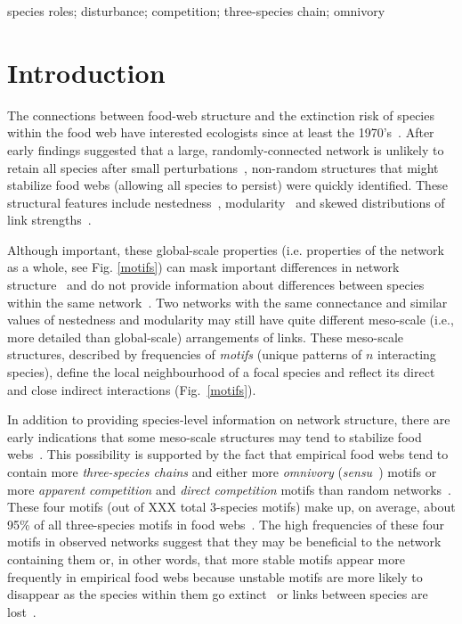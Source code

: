 \documentclass[12pt]{article}
\begin{document}
\begin{spacing}{2.0}
	species roles; disturbance; competition; three-species chain; omnivory

\clearpage
    
\section*{Introduction}

	The connections between food-web structure and the extinction risk of species within the food web have interested ecologists since at least the 1970's~\citep{May1972}. After early findings suggested that a large, randomly-connected network is unlikely to retain all species after small perturbations~\citep{Gardner1970,May1972}, non-random structures that might stabilize food webs (allowing all species to persist) were quickly identified. These structural features include nestedness~\citep{Allesina2012,Sauve2014}, modularity~\citep{Sauve2014,Thebault2010} and skewed distributions of link strengths~\citep{McCann1998,Gross2009,Rooney2012,Wootton2016}.
	
	
	Although important, these global-scale properties (i.e. properties of the network as a whole, see Fig. \ref{motifs}) can mask important differences in  network structure~\citep{Simmons2019} and do not provide information about differences between species within the same network~\citep{Cirtwill2018FoodWebs}. 
	Two networks with the same connectance and similar values of nestedness and modularity may still have quite different meso-scale (i.e., more detailed than global-scale) arrangements of links. 
	These meso-scale structures, described by frequencies of \emph{motifs} (unique patterns of $n$ interacting species), define the local neighbourhood of a focal species and reflect its direct and close indirect interactions (Fig.~\ref{motifs}).
	
	
    In addition to providing species-level information on network structure, there are early indications that some meso-scale structures may tend to stabilize food webs~\citep{Prill2005,Borrelli2015,Monteiro2016}. 
    This possibility is supported by the fact that empirical food webs tend to contain more \emph{three-species chains} and either more \emph{omnivory} (\emph{sensu}~\citealp[]{Thompson2007b}) motifs or more \emph{apparent competition} and \emph{direct competition} motifs than random networks~\citep{Stouffer2007}. 
    These four motifs (out of XXX total 3-species motifs) make up, on average, about 95\% of all three-species motifs in food webs~\citep{Stouffer2010b}. 
    The high frequencies of these four motifs in observed networks suggest that they may be beneficial to the network containing them or, in other words, that more stable motifs appear more frequently in empirical food webs because unstable motifs are more likely to disappear as the species within them go extinct~\citep{Borrelli2015,Borrelli2015a} or links between species are lost~\citep{Tylianakis2010}.


\end{spacing}
\end{document}
